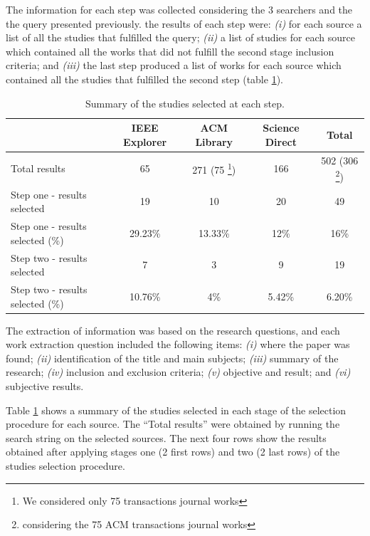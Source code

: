 The information for each step was collected considering the 3 searchers
and the the query presented previously. the results of each step were:
\textit{(i)} for each source a list of all the studies that
fulfilled the query; \textit{(ii)} a list
of studies for each source which contained all the works that did not fulfill the
second stage inclusion criteria; and
\textit{(iii)} the last step produced a list of works for each source which
contained all the studies that fulfilled the second step (table
\ref{tab:result01}).

 
\begin{table}
\begin{tabular}{l|c|c|c|c}
  \hline
  \hline
   & IEEE Explorer & ACM Library & Science Direct & Total \\
  \hline
  \hline
  Total results & 65 & 271 (75 \footnote{We considered only 75 transactions
  journal works}) & 166 & 502 (306 \footnote{considering the 75 ACM
  transactions journal works}) \\ 
  \hline
  Step one - results selected & 19 & 10 & 20  & 49 \\
  Step one - results selected (\%) & 29.23\% & 13.33\% & 12\% &
  16\% \\ 
  \hline 
  Step two - results selected & 7 & 3 & 9 & 19\\
  Step two - results selected (\%)  & 10.76\% & 4\% & 5.42\% & 6.20\%\\ 
  \hline
  \hline
\end{tabular}
\caption{Summary of the studies selected at each step.}
\label{tab:result01}
\end{table} 

 
The extraction of information was based on the research questions, and each work extraction question included the following
items: \textit{(i)} where the paper was found; \textit{(ii)} identification of the title and main
subjects; \textit{(iii)} summary of the research; \textit{(iv)} inclusion and
exclusion criteria; \textit{(v)} objective and result; and \textit{(vi)}
subjective results.

Table \ref{tab:result01} shows a summary of the studies selected in each stage
of the selection procedure for each source. The ``Total results'' were obtained
by running the search string on the selected sources. The next four rows show
the results obtained after applying stages one (2 first rows) and two (2 last
rows) of the studies selection procedure. 

